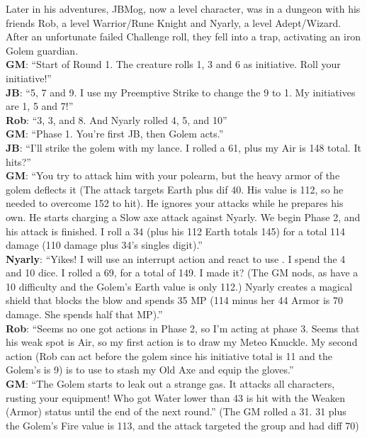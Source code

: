 \begin{multimog}
Later in his adventures, JBMog, now a  level character, was in a dungeon with his friends Rob, a  level Warrior/Rune Knight and Nyarly, a  level Adept/Wizard. After an unfortunate failed Challenge roll, they fell into a trap, activating an iron Golem guardian. \\
\textbf{GM}: \enquote{Start of Round 1. The creature rolls 1, 3 and 6 as initiative. Roll your initiative!} \\
\textbf{JB}: \enquote{5, 7 and 9. I use my Preemptive Strike to change the 9 to 1. My initiatives are 1, 5 and 7!} \\
\textbf{Rob}: \enquote{3, 3, and 8. And Nyarly rolled 4, 5, and 10} \\
\textbf{GM}: \enquote{Phase 1. You're first JB, then Golem acts.} \\
\textbf{JB}: \enquote{I'll strike the golem with my lance. I rolled a 61, plus my Air is 148 total. It hits?} \\
\textbf{GM}: \enquote{You try to attack him with your polearm, but the heavy armor of the golem deflects it (The attack targets Earth plus dif 40. His value is 112, so he needed to overcome 152 to hit). He ignores your attacks while he prepares his own. He starts charging a Slow axe attack against Nyarly. We begin Phase 2, and his attack is finished. I roll a 34 (plus his 112 Earth totals 145) for a total 114 damage (110 damage plus 34's singles digit).} \\
\textbf{Nyarly}: \enquote{Yikes! I will use an interrupt action and react to use . I spend the 4 and 10 dice. I rolled a 69, for a total of 149. I made it? (The GM nods, as  have a 10 difficulty and the Golem's Earth value is only 112.) Nyarly creates a magical shield that blocks the blow and spends 35 MP (114 minus her 44 Armor is 70 damage. She spends half that MP).} \\
\textbf{Rob}: \enquote{Seems no one got actions in Phase 2, so I'm acting at phase 3. Seems that his weak spot is Air, so my first action is to draw my Meteo Knuckle. My second action (Rob can act before the golem since his initiative total is 11 and the Golem's is 9) is to use  to stash my Old Axe and equip the gloves.} \\
\textbf{GM}: \enquote{The Golem starts to leak out a strange gas. It attacks all characters, rusting your equipment! Who got Water lower than 43 is hit with the Weaken (Armor) status until the end of the next round.} (The GM rolled a 31. 31 plus the Golem's Fire value is 113, and the attack targeted the group and had diff 70) \\

\end{multimog}
